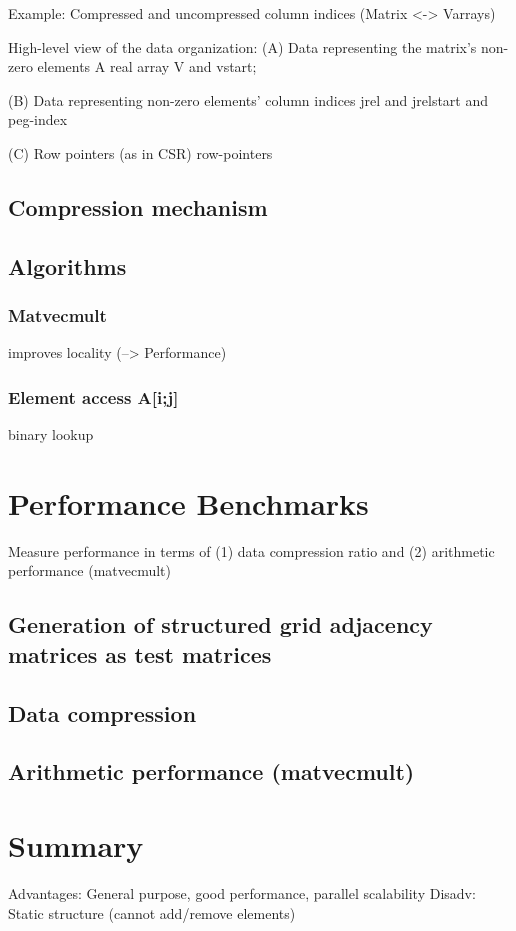 \documentclass{article}
\begin{document}
      Example: Compressed and uncompressed column indices (Matrix <-> Varrays)

    High-level view of the data organization:
    (A) Data representing the matrix's non-zero elements
      A real array V  and vstart;

    (B) Data representing non-zero elements' column indices
      jrel and jrelstart and peg-index

    (C) Row pointers (as in CSR) row-pointers

  \subsection{Compression mechanism}

  \subsection{Algorithms}

    \subsubsection{Matvecmult}
      improves locality (--> Performance)

    \subsubsection{Element access A[i;j]}
      binary lookup
\section{Performance Benchmarks}
  Measure performance in terms of (1) data compression ratio and (2) arithmetic performance (matvecmult)

  \subsection{Generation of structured grid adjacency matrices as test matrices}

  \subsection{Data compression}

  \subsection{Arithmetic performance (matvecmult)}

\section{Summary}
  Advantages: General purpose, good performance, parallel scalability
  Disadv: Static structure (cannot add/remove elements)

\printbibliography
\end{document}
